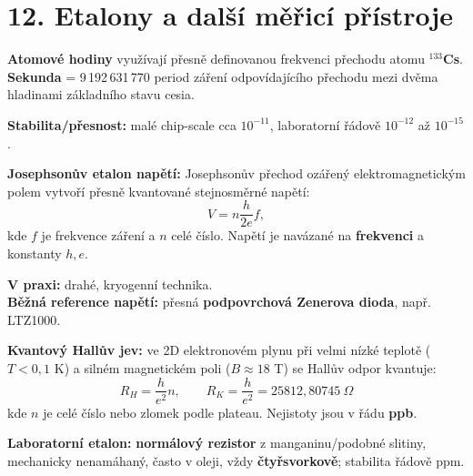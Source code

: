 \documentclass[12pt]{article}
\newcounter{chapternumber}
\newcounter{questionnumber}
\renewcommand{\thequestionnumber}{\arabic{chapternumber}.\arabic{questionnumber}}
\begin{document}
\newpage
\section*{12. Etalony a další měřicí přístroje}
\setcounter{chapternumber}{12}
\setcounter{questionnumber}{0}

\begin{tcolorbox}[title={\stepcounter{questionnumber}\thequestionnumber. Vysvětlete princip absolutního etalonu frekvence – atomových hodin. Jaké stability řádově dosahují? (4)}]
\textbf{Atomové hodiny} využívají přesně definovanou frekvenci přechodu atomu \textbf{$^{133}$Cs}.\\
\textbf{Sekunda} = 9\,192\,631\,770 period záření odpovídajícího přechodu mezi dvěma hladinami základního stavu cesia.

\textbf{Stabilita/přesnost:} malé chip-scale cca $10^{-11}$, laboratorní řádově $10^{-12}$ až $10^{-15}$.
\end{tcolorbox}

\begin{tcolorbox}[title={\stepcounter{questionnumber}\thequestionnumber. Vysvětlete princip kvantového etalonu napětí využívajícího Josephsonův jev. Jaký referenční prvek se používá v běžných napěťových referencích? (13–16)}]
\textbf{Josephsonův etalon napětí:} Josephsonův přechod ozářený elektromagnetickým polem vytvoří přesně kvantované stejnosměrné napětí:
\[
V = n \frac{h}{2e} f,
\]
kde $f$ je frekvence záření a $n$ celé číslo. Napětí je navázané na \textbf{frekvenci} a konstanty $h,e$.

\textbf{V praxi:} drahé, kryogenní technika.\\
\textbf{Běžná reference napětí:} přesná \textbf{podpovrchová Zenerova dioda}, např. LTZ1000.
\end{tcolorbox}

\begin{tcolorbox}[title={\stepcounter{questionnumber}\thequestionnumber. Vysvětlete princip kvantového etalonu odporu využívajícího kvantový Hallův jev. Jak vypadá praktický laboratorní etalon odporu? (18–20)}]
\textbf{Kvantový Hallův jev:} ve 2D elektronovém plynu při velmi nízké teplotě ($T<0{,}1$ K) a silném magnetickém poli ($B\approx18$ T) se Hallův odpor kvantuje:
\[
R_H=\frac{h}{e^2}n,\qquad R_K=\frac{h}{e^2}=25812{,}80745~\Omega
\]
kde $n$ je celé číslo nebo zlomek podle plateau. Nejistoty jsou v řádu \textbf{ppb}.

\textbf{Laboratorní etalon:} \textbf{normálový rezistor} z manganinu/podobné slitiny, mechanicky nenamáhaný, často v oleji, vždy \textbf{čtyřsvorkově}; stabilita řádově ppm.
\end{tcolorbox}
\end{document}
